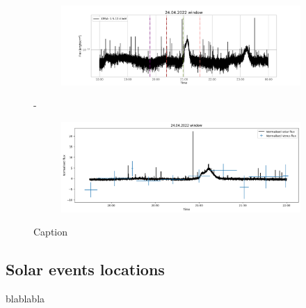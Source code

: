     \begin{figure}[H]
        \centering
        \begin{subfigure}{\textwidth}
            \includegraphics[width=\textwidth]{report/Figures/results/GOES_24.png}
        \end{subfigure}%
        \hspace{1em}-
        \begin{subfigure}{\textwidth}
            \centering
            \includegraphics[width=\textwidth]{report/Figures/results/norm_24.png}
        \end{subfigure}
        \caption{Caption}
        \label{goes_24}
    \end{figure}
    
    \subsection{Solar events locations}
    blablabla

